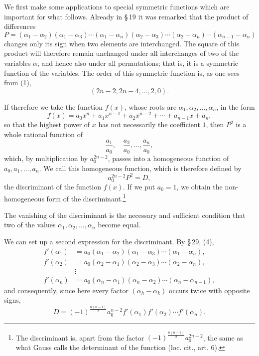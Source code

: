 \documentclass[11pt]{article}
\begin{document}
We first make some applications to special symmetric functions which are important for what follows. Already in \S\,19 it was remarked that the product of differences
\begin{equation}
 P=(\alpha_1-\alpha_2)(\alpha_1-\alpha_3)\cdots(\alpha_1-\alpha_n)
   (\alpha_2-\alpha_3)\cdots(\alpha_2-\alpha_n)\cdots(\alpha_{n-1}-\alpha_n)
\tag{1}
\end{equation}
changes only its sign when two elements are interchanged. The square of this product will therefore remain unchanged under all interchanges of two of the variables \(\alpha\), and hence also under all permutations; that is, it is a symmetric function of the variables. The order of this symmetric function is, as one sees from (1),
\[
 (2n-2,2n-4,\ldots,2,0).
\]

If therefore we take the function \(f(x)\), whose roots are \(\alpha_1,\alpha_2,\ldots,\alpha_n\), in the form
\[
 f(x)=a_0x^n+a_1x^{n-1}+a_2x^{n-2}+\cdots+a_{n-1}x+a_n,
\]
so that the highest power of \(x\) has not necessarily the coefficient \(1\), then \(P^2\) is a whole rational function of
\begin{equation}
 \frac{a_1}{a_0},\quad \frac{a_2}{a_0},\ldots,\frac{a_n}{a_0},
\tag{2}
\end{equation}
which, by multiplication by \(a_0^{2n-2}\), passes into a homogeneous function of \(a_0,a_1,\ldots,a_n\). We call this homogeneous function, which is therefore defined by
\begin{equation}
 a_0^{2n-2}P^2=D,
\tag{3}
\end{equation}
the discriminant of the function \(f(x)\). If we put \(a_0=1\), we obtain the non-homogeneous form of the discriminant.\footnote{The discriminant is, apart from the factor \((-1)^{\frac{n(n-1)}2}a_0^{2n-2}\), the same as what Gauss calls the determinant of the function (loc. cit., art. 6).}

The vanishing of the discriminant is the necessary and sufficient condition that two of the values \(\alpha_1,\alpha_2,\ldots,\alpha_n\) become equal.

We can set up a second expression for the discriminant. By \S\,29, (4),
\[
\begin{aligned}
 f'(\alpha_1)&=a_0(\alpha_1-\alpha_2)(\alpha_1-\alpha_3)\cdots(\alpha_1-\alpha_n),\\
 f'(\alpha_2)&=a_0(\alpha_2-\alpha_1)(\alpha_2-\alpha_3)\cdots(\alpha_2-\alpha_n),\\
 &\vdots\\
 f'(\alpha_n)&=a_0(\alpha_n-\alpha_1)(\alpha_n-\alpha_2)\cdots(\alpha_n-\alpha_{n-1}),
\end{aligned}
\]
and consequently, since here every factor \((\alpha_h-\alpha_k)\) occurs twice with opposite signs,
\begin{equation}
 D=(-1)^{\frac{n(n-1)}2}a_0^{n-2}f'(\alpha_1)f'(\alpha_2)\cdots f'(\alpha_n).
\tag{5}
\end{equation}
\end{document}
